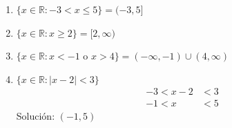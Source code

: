 \documentclass[12pt,a4paper]{article}
\begin{document}
\begin{enumerate}
    \item $\{x \in \mathbb{R} : -3 < x \leq 5\} = (-3, 5]$
    
    \item $\{x \in \mathbb{R} : x \geq 2\} = [2, \infty)$
    
    \item $\{x \in \mathbb{R} : x < -1 \text{ o } x > 4\} = (-\infty, -1) \cup (4, \infty)$
    
    \item $\{x \in \mathbb{R} : |x - 2| < 3\}$
    \begin{align*}
        -3 < x - 2 &< 3\\
        -1 < x &< 5
    \end{align*}
    Solución: $(-1, 5)$
\end{enumerate}
\end{document}
